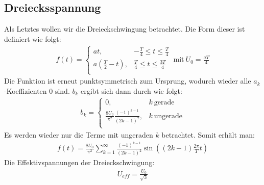 \subsection*{Dreiecksspannung}
\label{sub:triangle}
Als Letztes wollen wir die Dreieckschwingung betrachtet. Die Form dieser ist definiert wie folgt:
\begin{gather}
    f(t) = 
    \begin{cases}
        at, & -\frac{T}{4} \leq t \leq \frac{T}{4} \\
        a\left(\frac{T}{2}-t\right), & \frac{T}{4} \leq t \leq \frac{3T}{4} \\
    \end{cases}
    ~\text{mit}~U_0 = \frac{aT}{4}
\end{gather} 
Die Funktion ist erneut punktsymmetrisch zum Ursprung, wodurch wieder alle $a_k$-Koeffizienten 0 sind. $b_k$ ergibt sich dann durch wie folgt:
\begin{gather}
    b_k =
    \begin{cases}
        0, & k~\text{gerade}\\
        \frac{8U_0}{\pi^2}\frac{(-1)^{k-1}}{(2k-1)^2}, & k~\text{ungerade}\\
    \end{cases}
\end{gather}
Es werden wieder nur die Terme mit ungeraden $k$ betrachtet. Somit erhält man:
\begin{gather}
    \boxed{f(t) = \frac{8U_0}{\pi^2} \sum^{\infty}_{k=1} \frac{(-1)^{k-1}}{(2k-1)^2} \sin((2k-1)\frac{2\pi}{T}t)}
\end{gather} 
Die Effektivspannungen der Dreieckschwingung:
\begin{gather}
     \boxed{U_{eff} = \frac{U_0}{\sqrt{3}}}
\end{gather}